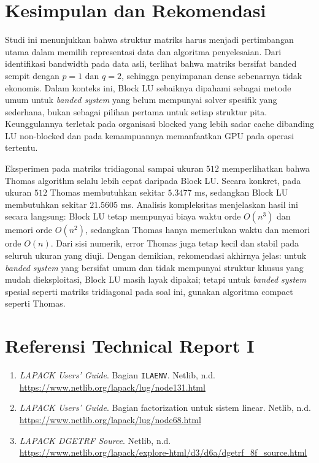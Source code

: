 \documentclass[12pt,a4paper]{article}
\begin{document}
\section{Kesimpulan dan Rekomendasi}
Studi ini menunjukkan bahwa struktur matriks harus menjadi pertimbangan utama dalam memilih representasi data dan algoritma penyelesaian. Dari identifikasi bandwidth pada data asli, terlihat bahwa matriks bersifat banded sempit dengan $p=1$ dan $q=2$, sehingga penyimpanan dense sebenarnya tidak ekonomis. Dalam konteks ini, Block LU sebaiknya dipahami sebagai metode umum untuk \emph{banded system} yang belum mempunyai solver spesifik yang sederhana, bukan sebagai pilihan pertama untuk setiap struktur pita. Keunggulannya terletak pada organisasi blocked yang lebih sadar cache dibanding LU non-blocked dan pada kemampuannya memanfaatkan GPU pada operasi tertentu.

Eksperimen pada matriks tridiagonal sampai ukuran $512$ memperlihatkan bahwa Thomas algorithm selalu lebih cepat daripada Block LU. Secara konkret, pada ukuran $512$ Thomas membutuhkan sekitar $5.3477$ ms, sedangkan Block LU membutuhkan sekitar $21.5605$ ms. Analisis kompleksitas menjelaskan hasil ini secara langsung: Block LU tetap mempunyai biaya waktu orde $O(n^3)$ dan memori orde $O(n^2)$, sedangkan Thomas hanya memerlukan waktu dan memori orde $O(n)$. Dari sisi numerik, error Thomas juga tetap kecil dan stabil pada seluruh ukuran yang diuji. Dengan demikian, rekomendasi akhirnya jelas: untuk \emph{banded system} yang bersifat umum dan tidak mempunyai struktur khusus yang mudah dieksploitasi, Block LU masih layak dipakai; tetapi untuk \emph{banded system} spesial seperti matriks tridiagonal pada soal ini, gunakan algoritma compact seperti Thomas.

\section*{Referensi Technical Report I}
\begin{enumerate}[leftmargin=1.25em]
  \item \emph{LAPACK Users' Guide}. Bagian \texttt{ILAENV}. Netlib, n.d. \url{https://www.netlib.org/lapack/lug/node131.html}
  \item \emph{LAPACK Users' Guide}. Bagian factorization untuk sistem linear. Netlib, n.d. \url{https://www.netlib.org/lapack/lug/node68.html}
  \item \emph{LAPACK DGETRF Source}. Netlib, n.d. \url{https://www.netlib.org/lapack/explore-html/d3/d6a/dgetrf_8f_source.html}
\end{enumerate}
\end{document}
